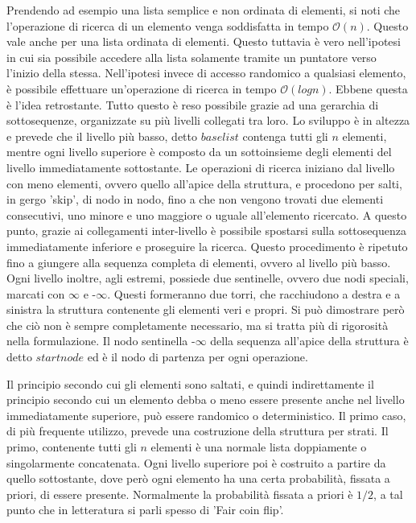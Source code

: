 	Prendendo ad esempio una lista semplice e non ordinata di elementi, si noti che l'operazione di ricerca di un elemento venga soddisfatta in tempo $\mathcal{O}(n)$. Questo vale anche per una lista ordinata di elementi. Questo tuttavia è vero nell'ipotesi in cui sia possibile accedere alla lista solamente tramite un puntatore verso l'inizio della stessa. Nell'ipotesi invece di accesso randomico a qualsiasi elemento, è possibile effettuare un'operazione di ricerca in tempo $\mathcal{O}(log{}n)$. Ebbene questa è l'idea retrostante.
	Tutto questo è reso possibile grazie ad una gerarchia di sottosequenze, organizzate su più livelli collegati tra loro. Lo sviluppo è in altezza e prevede che il livello più basso, detto $base list$ contenga tutti gli $ n $ elementi, mentre ogni livello superiore è composto da un sottoinsieme degli elementi del livello immediatamente sottostante. Le operazioni di ricerca iniziano dal livello con meno elementi, ovvero quello all'apice della struttura, e procedono per salti, in gergo 'skip', di nodo in nodo, fino a che non vengono trovati due elementi consecutivi, uno minore e uno maggiore o uguale all'elemento ricercato. A questo punto, grazie ai collegamenti inter-livello è possibile spostarsi sulla sottosequenza immediatamente inferiore e proseguire la ricerca. Questo procedimento è ripetuto fino a giungere alla sequenza completa di elementi, ovvero al livello più basso.
	Ogni livello inoltre, agli estremi, possiede due sentinelle, ovvero due nodi speciali, marcati con $\infty$ e -$\infty$. Questi formeranno due torri, che racchiudono a destra e a sinistra la struttura contenente gli elementi veri e propri. Si può dimostrare però che ciò non è sempre completamente necessario, ma si tratta più di rigorosità nella formulazione.
	Il nodo sentinella -$\infty$ della sequenza all'apice della struttura è detto $start node$ ed è il nodo di partenza per ogni operazione.
	
	Il principio secondo cui gli elementi sono saltati, e quindi indirettamente il principio secondo cui un elemento debba o meno essere presente anche nel livello immediatamente superiore, può essere randomico o deterministico. Il primo caso, di più frequente utilizzo, prevede una costruzione della struttura per strati. Il primo, contenente tutti gli $ n $ elementi è una normale lista doppiamente o singolarmente concatenata. Ogni livello superiore poi è costruito a partire da quello sottostante, dove però ogni elemento ha una certa probabilità, fissata a priori, di essere presente. Normalmente la probabilità fissata a priori è $ 1/2 $, a tal punto che in letteratura si parli spesso di 'Fair coin flip'.
	
